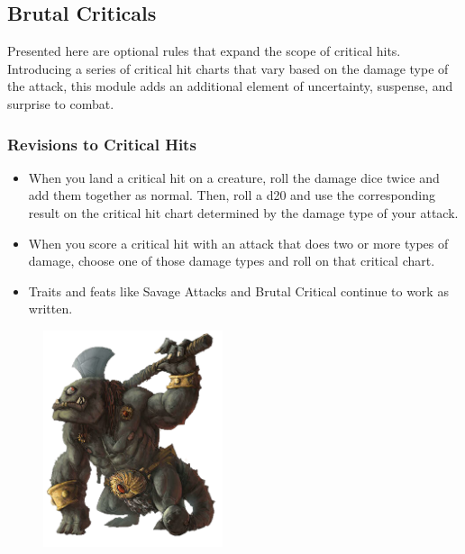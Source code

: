 \subsection*{Brutal Criticals} \label{ssec::brutalcriticals}

Presented here are optional rules that expand the scope of critical hits.
Introducing a series of critical hit charts that vary based on the damage type of the attack, this module adds an additional element of uncertainty, suspense, and surprise to combat.

\subsubsection{Revisions to Critical Hits}
    \begin{itemize}
        \item When you land a critical hit on a creature, roll the damage dice twice and add them together as normal.
        Then, roll a d20 and use the corresponding result on the critical hit chart determined by the damage type of your attack.
        \item When you score a critical hit with an attack that does two or more types of damage, choose one of those damage types and roll on that critical chart.
        \item Traits and feats like Savage Attacks and Brutal Critical continue to work as written.
    \end{itemize}

\begin{figure}[t]
    \centering
    \includegraphics[width=0.47\textwidth]{03mechanics/img/31cyclops.png}
\end{figure}


